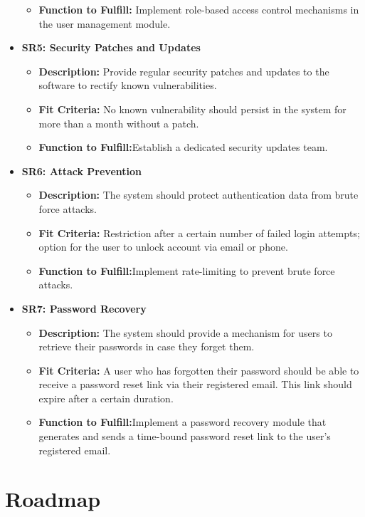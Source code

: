 \documentclass{article}
\begin{document}
\begin{itemize}
\begin{itemize}
  \item \textbf{Function to Fulfill:} Implement role-based access control mechanisms in the user management module.
  \end{itemize}
\item \textbf{SR5: Security Patches and Updates}
  \begin{itemize}
  \item \textbf{Description:} Provide regular security patches and updates to the software to rectify known vulnerabilities.
  \item \textbf{Fit Criteria:} No known vulnerability should persist in the system for more than a month without a patch.
  \item \textbf{Function to Fulfill:}Establish a dedicated security updates team.
  \end{itemize}
\item \textbf{SR6: Attack Prevention}
  \begin{itemize}
  \item \textbf{Description:} The system should protect authentication data from brute force attacks.
  \item \textbf{Fit Criteria:} Restriction after a certain number of failed login attempts; option for the user to unlock account via email or phone.
  \item \textbf{Function to Fulfill:}Implement rate-limiting to prevent brute force attacks.
  \end{itemize}
\item \textbf{SR7: Password Recovery}
  \begin{itemize}
  \item \textbf{Description:} The system should provide a mechanism for users to retrieve their passwords in case they forget them.
  \item \textbf{Fit Criteria:} A user who has forgotten their password should be able to receive a password reset link via their registered email. This link should expire after a certain duration.
  \item \textbf{Function to Fulfill:}Implement a password recovery module that generates and sends a time-bound password reset link to the user's registered email.
  \end{itemize}
\end{itemize}

\section{Roadmap}

\end{document}
